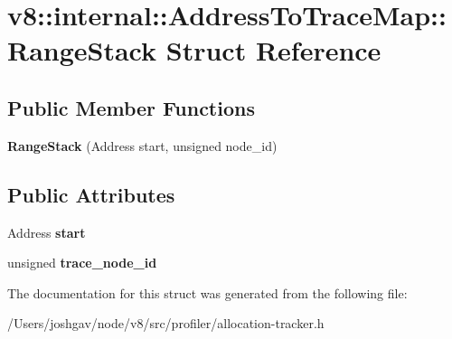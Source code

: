 \hypertarget{structv8_1_1internal_1_1_address_to_trace_map_1_1_range_stack}{}\section{v8\+:\+:internal\+:\+:Address\+To\+Trace\+Map\+:\+:Range\+Stack Struct Reference}
\label{structv8_1_1internal_1_1_address_to_trace_map_1_1_range_stack}
\subsection*{Public Member Functions}
\begin{DoxyCompactItemize}
\item 
{\bfseries Range\+Stack} (Address start, unsigned node\+\_\+id)\hypertarget{structv8_1_1internal_1_1_address_to_trace_map_1_1_range_stack_afb9df7dc25c216732a5a812809ff25ab}{}\label{structv8_1_1internal_1_1_address_to_trace_map_1_1_range_stack_afb9df7dc25c216732a5a812809ff25ab}

\end{DoxyCompactItemize}
\subsection*{Public Attributes}
\begin{DoxyCompactItemize}
\item 
Address {\bfseries start}\hypertarget{structv8_1_1internal_1_1_address_to_trace_map_1_1_range_stack_a3d4b824c4d909f3bf9d1d94cb5808f12}{}\label{structv8_1_1internal_1_1_address_to_trace_map_1_1_range_stack_a3d4b824c4d909f3bf9d1d94cb5808f12}

\item 
unsigned {\bfseries trace\+\_\+node\+\_\+id}\hypertarget{structv8_1_1internal_1_1_address_to_trace_map_1_1_range_stack_a6ea3ebf0e95229ce4e9ab90d0b364566}{}\label{structv8_1_1internal_1_1_address_to_trace_map_1_1_range_stack_a6ea3ebf0e95229ce4e9ab90d0b364566}

\end{DoxyCompactItemize}


The documentation for this struct was generated from the following file\+:\begin{DoxyCompactItemize}
\item 
/\+Users/joshgav/node/v8/src/profiler/allocation-\/tracker.\+h\end{DoxyCompactItemize}
